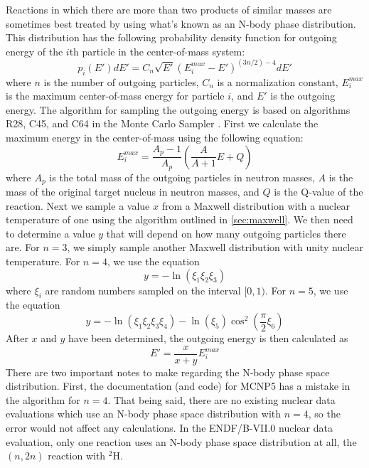 Reactions in which there are more than two products of similar masses are
sometimes best treated by using what's known as an N-body phase
distribution. This distribution has the following probability density function
for outgoing energy of the $i$th particle in the center-of-mass system:
\begin{equation}
  \label{eq:n-body-pdf}
  p_i(E') dE' = C_n \sqrt{E'} (E_i^{max} - E')^{(3n/2) - 4} dE'
\end{equation}
where $n$ is the number of outgoing particles, $C_n$ is a normalization
constant, $E_i^{max}$ is the maximum center-of-mass energy for particle $i$, and
$E'$ is the outgoing energy. The algorithm for sampling the outgoing energy is
based on algorithms R28, C45, and C64 in the Monte Carlo Sampler
\cite{lanl-everett-1983}. First we calculate the maximum energy in the
center-of-mass using the following equation:
\begin{equation}
  \label{eq:n-body-emax}
  E_i^{max} = \frac{A_p - 1}{A_p} \left ( \frac{A}{A+1} E + Q \right )
\end{equation}
where $A_p$ is the total mass of the outgoing particles in neutron masses, $A$
is the mass of the original target nucleus in neutron masses, and $Q$ is the
Q-value of the reaction. Next we sample a value $x$ from a Maxwell distribution
with a nuclear temperature of one using the algorithm outlined in
\autoref{sec:maxwell}. We then need to determine a value $y$ that will depend on
how many outgoing particles there are. For $n = 3$, we simply sample another
Maxwell distribution with unity nuclear temperature. For $n = 4$, we use the
equation
\begin{equation}
  \label{eq:n-body-y4}
  y = -\ln ( \xi_1 \xi_2 \xi_3 )
\end{equation}
where $\xi_i$ are random numbers sampled on the interval
$[0,1)$. For $n = 5$, we use the equation
\begin{equation}
  \label{eq:n-body-y5}
  y = -\ln ( \xi_1 \xi_2 \xi_3 \xi_4 ) - \ln ( \xi_5 ) \cos^2 \left (
  \frac{\pi}{2} \xi_6 \right )
\end{equation}
After $x$ and $y$ have been determined, the outgoing energy is then
calculated as
\begin{equation}
  \label{eq:n-body-energy}
  E' = \frac{x}{x + y} E_i^{max}
\end{equation}
There are two important notes to make regarding the N-body phase space
distribution. First, the documentation (and code) for MCNP5 has a mistake in the
algorithm for $n = 4$. That being said, there are no existing nuclear data
evaluations which use an N-body phase space distribution with $n = 4$, so the
error would not affect any calculations. In the ENDF/B-VII.0 nuclear data
evaluation, only one reaction uses an N-body phase space distribution at all,
the $(n,2n)$ reaction with $^2$H.

